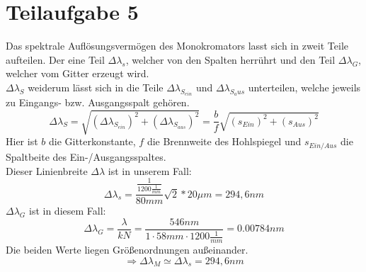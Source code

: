 

\section{Teilaufgabe 5}

Das spektrale Auflösungsvermögen des Monokromators lasst sich in zweit Teile aufteilen. Der eine Teil $\Delta \lambda _{s}$, welcher von den Spalten herrührt und 
den Teil $\Delta \lambda_{G}$, welcher vom Gitter erzeugt wird.\\
$ \Delta \lambda_{S}$ weiderum lässt sich in die Teile $ \Delta \lambda_{S_{ein}}$ und $ \Delta \lambda_{S_aus}$ unterteilen, welche jeweils zu Eingangs- bzw. Ausgangsspalt gehören.
\begin{equation}
     \Delta \lambda_{S} = \sqrt{(\Delta \lambda_{S_{ein}})^{2}+(\Delta \lambda_{S_{aus}})^{2}} = \frac{b}{f} \sqrt{(s_{Ein})^{2}+(s_{Aus})^{2}} 
\end{equation}
Hier ist $b$ die Gitterkonstante, $f$ die Brennweite des Hohlspiegel und $s_{Ein/Aus}$ die Spaltbeite des Ein-/Ausgangsspaltes.\\
Dieser Linienbreite $\Delta\lambda$ ist in unserem Fall:
\begin{equation}
    \Delta \lambda_{s} =\frac{\frac{1}{1200\frac{1}{mm} } }{80mm}  \sqrt{2} * 20 \mu m = 294,6nm
\end{equation}
$\Delta \lambda _{G}$ ist in diesem Fall:
\begin{equation}
    \Delta \lambda _{G} = \frac{\lambda }{kN} = \frac{546nm}{1 \cdot 58mm \cdot1200\frac{1}{mm} } = 0.00784 nm
\end{equation}
Die beiden Werte liegen Größenordnungen außeinander. 
\begin{equation}
    \Rightarrow \Delta \lambda _{M}\simeq \Delta \lambda_{s} = 294,6nm
\end{equation}
